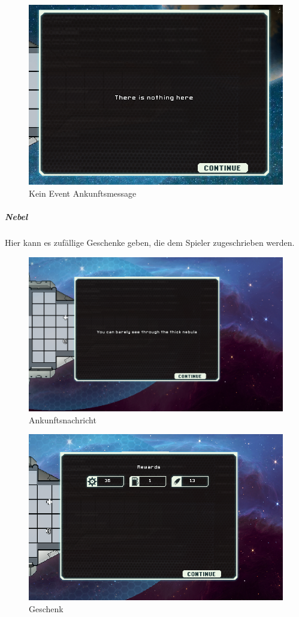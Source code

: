 \documentclass[fontsize=12pt,paper=a4,twoside]{scrartcl}
\begin{document}
\begin{figure}[H]
\centering
\includegraphics[width=1\linewidth]{DasSpiel/Karte/nothing.png}
\caption{Kein Event Ankunftsmessage}
\end{figure}
 
\subparagraph{Nebel} Hier kann es zufällige Geschenke geben, die dem Spieler zugeschrieben werden.

\begin{figure}[H]
\centering
\includegraphics[width=0.8\linewidth]{DasSpiel/Karte/nebular.png}
\caption{Ankunftsnachricht}
\end{figure} 


\begin{figure}[H]
\centering
\includegraphics[width=0.8\linewidth]{DasSpiel/Karte/nebularPresent.png}
\caption{Geschenk}
\end{figure} 
\end{document}
